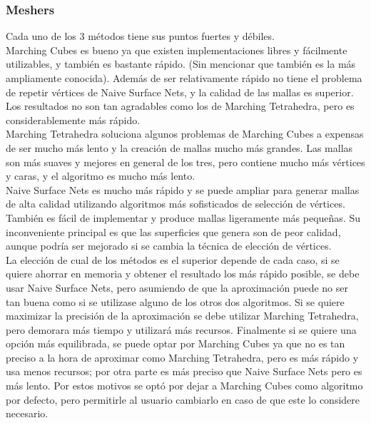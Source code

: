 \documentclass[12pt]{article}
\begin{document}
\subsubsection{Meshers}
Cada uno de los 3 métodos tiene sus puntos fuertes y débiles. 
\\Marching Cubes es bueno ya que existen implementaciones libres y fácilmente utilizables, y también es bastante rápido. (Sin mencionar que también es la más ampliamente conocida). Además de ser relativamente rápido no tiene el problema de repetir vértices de Naive Surface Nets, y la calidad de las mallas es superior. Los resultados no son tan agradables como los de Marching Tetrahedra, pero es considerablemente más rápido. 
\\Marching Tetrahedra soluciona algunos problemas de Marching Cubes a expensas de ser mucho más lento y la creación de mallas mucho más grandes. Las mallas son más suaves y mejores en general de los tres, pero contiene mucho más vértices y caras, y el algoritmo es mucho más lento.
\\Naive Surface Nets es mucho más rápido y se puede ampliar para generar mallas de alta calidad utilizando algoritmos más sofisticados de selección de vértices. También es fácil de implementar y produce mallas ligeramente más pequeñas. Su inconveniente principal es que las superficies que genera son de peor calidad, aunque podría ser mejorado si se cambia la técnica de elección de vértices. 
\\La elección de cual de los métodos es el superior depende de cada caso, si se quiere ahorrar en memoria y obtener el resultado los más rápido posible, se debe usar Naive Surface Nets, pero asumiendo de que la aproximación puede no ser tan buena como si se utilizase alguno de los otros dos algoritmos. Si se quiere maximizar la precisión de la aproximación se debe utilizar Marching Tetrahedra, pero demorara más tiempo y utilizará más recursos. Finalmente si se quiere una opción más equilibrada, se puede optar por Marching Cubes ya que no es tan preciso a la hora de aproximar como Marching Tetrahedra, pero es más rápido y usa menos recursos; por otra parte es más preciso que Naive Surface Nets pero es más lento. Por estos motivos se optó por dejar a Marching Cubes como algoritmo por defecto, pero permitirle al usuario cambiarlo en caso de que este lo considere necesario.
\end{document}
